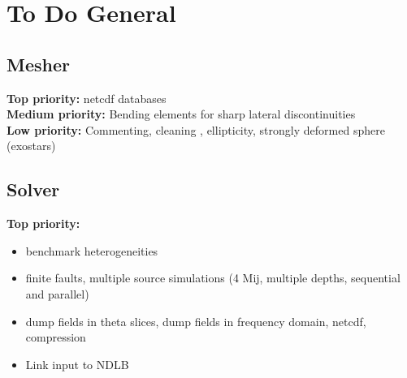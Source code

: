 \documentclass[11pt,letter,fleqn,english,notitlepage]{article}
\begin{document}
\newpage



\section{To Do General}
\subsection{Mesher}

\textbf{Top priority:} netcdf databases\\

\noindent\textbf{Medium priority:} Bending elements for sharp lateral discontinuities\\

\noindent\textbf{Low priority:} Commenting, cleaning , ellipticity, strongly deformed sphere
(exostars)

\subsection{Solver}
\noindent\textbf{Top priority:} 
\begin{itemize}
    \item benchmark heterogeneities
    \item finite faults, multiple source simulations (4 Mij,
    multiple depths, sequential and parallel)
    \item dump fields in theta slices, dump fields in frequency domain,
      netcdf, compression
    \item Link input to NDLB
\end{itemize}
\end{document}
